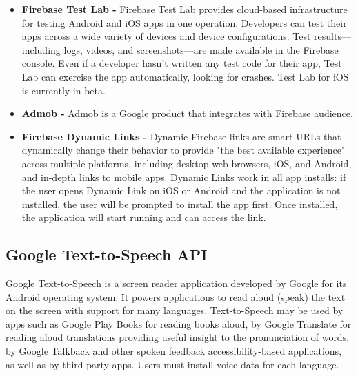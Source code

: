 \documentclass[14pt]{report}
\begin{document}
\begin{itemize}
						\item \textbf{Firebase Test Lab - }Firebase Test Lab provides cloud-based infrastructure for testing Android and iOS apps in one operation. Developers can test their apps across a wide variety of devices and device configurations. Test results—including logs, videos, and screenshots—are made available in the Firebase console. Even if a developer hasn't written any test code for their app, Test Lab can exercise the app automatically, looking for crashes. Test Lab for iOS is currently in beta.
						\item \textbf{Admob - }Admob is a Google product that integrates with Firebase audience.
						\item \textbf{Firebase Dynamic Links - }Dynamic Firebase links are smart URLs that dynamically change their behavior to provide "the best available experience" across multiple platforms, including desktop web browsers, iOS, and Android, and in-depth links to mobile apps. Dynamic Links work in all app installs: if the user opens Dynamic Link on iOS or Android and the application is not installed, the user will be prompted to install the app first. Once installed, the application will start running and can access the link.
					\end{itemize}
			\subsection{Google Text-to-Speech API}
				Google Text-to-Speech is a screen reader application developed by Google for its Android operating system. It powers applications to read aloud (speak) the text on the screen with support for many languages. Text-to-Speech may be used by apps such as Google Play Books for reading books aloud, by Google Translate for reading aloud translations providing useful insight to the pronunciation of words, by Google Talkback and other spoken feedback accessibility-based applications, as well as by third-party apps. Users must install voice data for each language.
\end{document}
